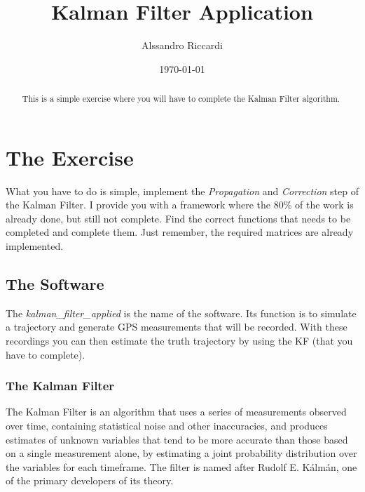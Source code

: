 \documentclass{article}
\title{Kalman Filter Application}
\author{Alssandro Riccardi}
\date{\today}
\begin{document}
    
        \maketitle
            
                    \begin{abstract}
                            This is a simple exercise where you will have to complete the Kalman Filter algorithm.
                                \end{abstract}
                                    
                                            \section{The Exercise}
                                                What you have to do is simple, implement the \textit{Propagation} and \textit{Correction} step of the Kalman Filter. I provide you with a framework where the 80\% of the work is already done, but still not complete. Find the correct functions that needs to be completed and complete them. Just remember, the required matrices are already implemented. 
                                                    
                                                            \subsection{The Software}
                                                                The \textit{kalman\_filter\_applied} is the name of the software. Its function is to simulate a trajectory and generate GPS measurements that will be recorded. With these recordings you can then estimate the truth trajectory by using the KF (that you have to complete).
                                                                    
                                                                        
                                                                                \subsubsection{The Kalman Filter}
                                                                                    The Kalman Filter is an algorithm that uses a series of measurements observed over time, containing statistical noise and other inaccuracies, and produces estimates of unknown variables that tend to be more accurate than those based on a single measurement alone, by estimating a joint probability distribution over the variables for each timeframe. The filter is named after Rudolf E. Kálmán, one of the primary developers of its theory. 
                                                                                        
\end{document}
